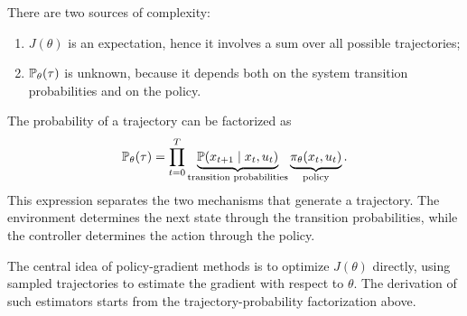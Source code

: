 There are two sources of complexity:
\begin{enumerate}
    \item \(J(\theta)\) is an expectation, hence it involves a sum over all possible trajectories;
    \item \(\mathbb{P}_\theta(\tau)\) is unknown, because it depends both on the system transition
    probabilities and on the policy.
\end{enumerate}

The probability of a trajectory can be factorized as
\[
\mathbb{P}_\theta(\tau)
=
\prod_{t=0}^{T}
\underbrace{\mathbb{P}(x_{t+1}\mid x_t,u_t)}_{\text{transition probabilities}}
\underbrace{\pi_\theta(x_t,u_t)}_{\text{policy}}.
\]
This expression separates the two mechanisms that generate a trajectory. The environment
determines the next state through the transition probabilities, while the controller determines
the action through the policy.

The central idea of policy-gradient methods is to optimize \(J(\theta)\) directly, using sampled
trajectories to estimate the gradient with respect to \(\theta\). The derivation of such estimators
starts from the trajectory-probability factorization above.
